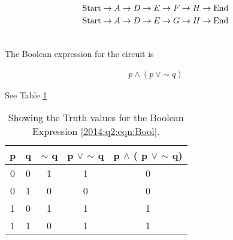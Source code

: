 \begin{subquestions}
\begin{subsubquestions}
\begin{align}
	\text{Start} \rightarrow A \rightarrow D \rightarrow E \rightarrow F \rightarrow H \rightarrow \text{End} \nonumber \\
	\text{Start} \rightarrow A \rightarrow D \rightarrow E \rightarrow G \rightarrow H \rightarrow \text{End} \nonumber \\ \nonumber
\end{align}
	
\end{subsubquestions}


\subquestion
\begin{subsubquestions}
	
\subsubquestion

The Boolean expression for the circuit is 

\begin{align}
	p \wedge (p \: \vee \sim q) \label{2014:q2:eqn:Bool}
\end{align}

\subsubquestion

See Table \ref{2014:tab:TrthTab}

\begin{table}[ht]
	\centering
	\begin{tabular}{|c|c|c|c|c|}
		\hline
		p&q& $\sim$ q & p $\vee$ $\sim$ q& p $\wedge$ ( p $\vee$ $\sim$ q) \\
		\hline
		0 & 0 & 1 & 1 & 0 \\
		0 & 1 & 0 & 0 & 0 \\
		1 & 0 & 1 & 1 & 1 \\
		1 & 1 & 0 & 1 & 1 \\
		\hline
	\end{tabular}
	\caption{\label{2014:tab:TrthTab} Showing the Truth values for the Boolean Expression \ref{2014:q2:eqn:Bool}.}
\end{table}

\end{subsubquestions}

\end{subquestions}

